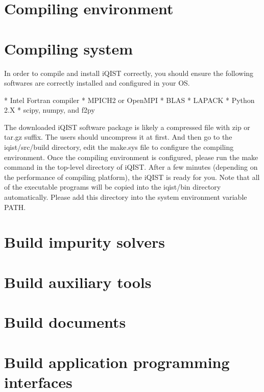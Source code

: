 \section{Compiling environment}

\section{Compiling system}

In order to compile and install iQIST correctly, you should ensure the
following softwares are correctly installed and configured in your OS.

* Intel Fortran compiler
* MPICH2 or OpenMPI
* BLAS
* LAPACK
* Python 2.X
* scipy, numpy, and f2py

The downloaded iQIST software package is likely a compressed file with zip
or tar.gz suffix. The users should uncompress it at first. And then go to
the iqist/src/build directory, edit the make.sys file to configure the
compiling environment. Once the compiling environment is configured,
please run the make command in the top-level directory of iQIST. After a
few minutes (depending on the performance of compiling platform), the
iQIST is ready for you. Note that all of the executable programs will be
copied into the iqist/bin directory automatically. Please add this
directory into the system environment variable PATH.

\section{Build impurity solvers}
\section{Build auxiliary tools}
\section{Build documents}
\section{Build application programming interfaces}
